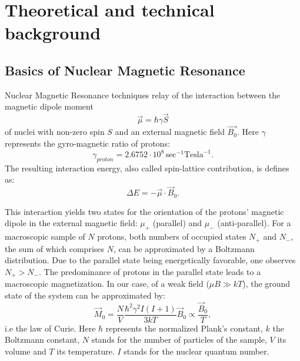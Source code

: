 \section{Theoretical and technical background}
\subsection{Basics of Nuclear Magnetic Resonance}

Nuclear Magnetic Resonance techniques relay of the interaction between the magnetic dipole moment
\begin{equation}
\label{magnetic dipole moment}
\vec{\mu} = \hbar\gamma\vec{S} 
\end{equation}
 of nuclei with non-zero spin $S$ and an external magnetic field $\vec{B_0}$. Here $\gamma$ represents the gyro-magnetic ratio of protons:
$$ \gamma_{proton} = 2.6752 \cdot 10^8 \, \textrm{sec}^{-1}\textrm{Tesla}^{-1}.
$$The resulting interaction energy, also called spin-lattice contribution, is defines as:
\begin{equation}
\label{interaction energy}
\Delta E = -\vec{\mu}\cdot\vec{B}_0.
\end{equation}

This interaction yields two states for the orientation of the protons' magnetic dipole in the external magnetic field: $\mu_+$ (parallel) and $\mu_-$ (anti-parallel).
For a macroscopic sample of $N$ protons, both numbers of occupied states $N_+$ and $N_-$, the sum of which comprises $N$, can be approximated by a Boltzmann distribution.
Due to the parallel state being energetically favorable, one observes $N_+>N_-$. The predominance of protons in the parallel state leads to a macroscopic magnetization.
In our case, of a weak field ($\mu B \gg kT$), the ground state of the system can be approximated by:
\begin{equation}
\label{ground state approx}
\vec{M}_0 = \frac{N}{V} \frac{\hbar^2 \gamma^2 I(I+1)}{3kT}\vec{B}_0 \propto \frac{\vec{B}_0}{T},
\end{equation}
i.e the law of Curie. Here $\hbar$ represents the normalized Plank's constant, $k$ the Boltzmann constant, $N$ stands for the number of particles of the sample, $V$ its volume and $T$ its temperature. $I$ stands for the nuclear quantum number. 

